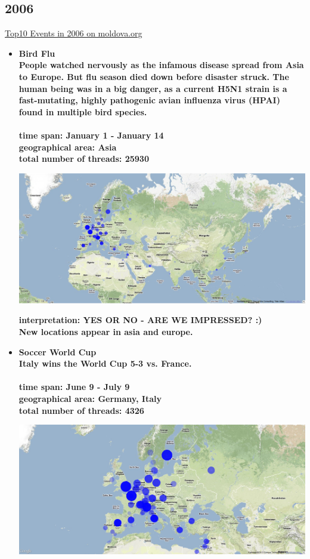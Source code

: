 \documentclass[11pt,a4paper,english]{article}
\begin{document}
			\subsection{2006}
			\href{http://social.moldova.org/news/10-most-important-world-events-of-2006-217385-eng.html}{Top10 Events in 2006 on moldova.org}
				\begin{itemize}
					\item \bf Bird Flu \rm
						\\ People watched nervously as the infamous disease spread from Asia to Europe. But flu season died down before disaster struck. The human being was in a big danger, as a current H5N1 strain is a fast-mutating, highly pathogenic avian influenza virus (HPAI) found in multiple bird species.
						\\\\ \bf time span: \rm January 1 - January 14
						\\ \bf geographical area: \rm Asia
						\\ \bf total number of threads: \rm 25930
						
						\includegraphics[width=130mm]{img/post-birdflu}
						
						\bf interpretation: \rm YES OR NO - ARE WE IMPRESSED? :)
						\\ New locations appear in asia and europe.
					
					
					
					\item \bf Soccer World Cup \rm
						\\ Italy wins the World Cup 5-3 vs. France.
						\\\\ \bf time span: \rm June 9 - July 9
						\\ \bf geographical area: \rm Germany, Italy
						\\ \bf total number of threads: \rm 4326
						
						\includegraphics[width=130mm]{img/post-wcfinal}
						

\end{itemize}
\end{document}

